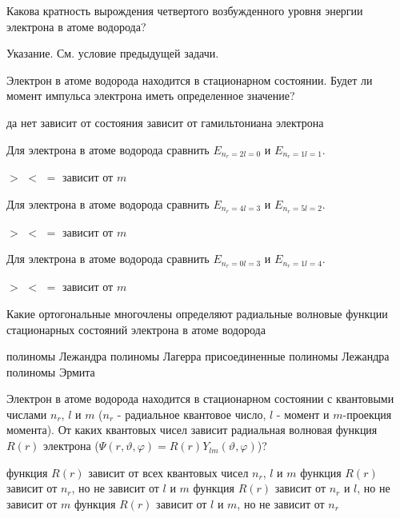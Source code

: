 \documentclass[11pt,a4paper]{exam}
\begin{document}
\begin{questions}
\question Какова кратность вырождения четвертого возбужденного уровня энергии электрона в атоме водорода? 
\begin{choices}
Указание. См. условие предыдущей задачи.
\end{choices}

\question Электрон в атоме водорода находится в стационарном состоянии. Будет ли момент импульса электрона иметь определенное значение?
\begin{choices}
\choice да                
\choice нет
\choice зависит от состояния       
\choice зависит от гамильтониана электрона
\end{choices}

\question Для электрона в атоме водорода сравнить ${E_{{n_r} = 2l = 0}}$ и ${E_{{n_r} = 1l = 1}}$.
\begin{choices}
\choice $ > $       
\choice $ < $       
\choice $ = $    
\choice зависит от $m$
\end{choices}

\question Для электрона в атоме водорода сравнить ${E_{{n_r} = 4l = 3}}$ и ${E_{{n_r} = 5l = 2}}$.
\begin{choices}
\choice $ > $       
\choice $ < $       
\choice $ = $       
\choice зависит от $m$
\end{choices}

\question Для электрона в атоме водорода сравнить ${E_{{n_r} = 0l = 3}}$ и ${E_{{n_r} = 1l = 4}}$.
\begin{choices}
\choice $ > $       
\choice $ < $       
\choice $ = $       
\choice зависит от $m$ 
\end{choices}

\question Какие ортогональные многочлены определяют радиальные волновые функции стационарных состояний электрона в атоме водорода
\begin{choices}
\choice полиномы Лежандра          
\choice полиномы Лагерра
\choice присоединенные полиномы Лежандра       
\choice полиномы Эрмита
\end{choices}

\question Электрон в атоме водорода находится в стационарном состоянии с квантовыми числами ${n_r}$, $l$ и $m$ (${n_r}$ - радиальное квантовое число, $l$ - момент и $m$-проекция момента). От каких квантовых чисел зависит радиальная волновая функция $R(r)$ электрона ($\Psi (r,\vartheta ,\varphi ) = R(r){Y_{lm}}(\vartheta ,\varphi )$)?
\begin{choices}
\choice функция $R(r)$ зависит от всех квантовых чисел ${n_r}$, $l$ и $m$
\choice функция $R(r)$ зависит от ${n_r}$, но не зависит от $l$ и $m$
\choice функция $R(r)$ зависит от ${n_r}$ и $l$, но не зависит от $m$
\choice функция $R(r)$ зависит от $l$ и $m$, но не зависит от ${n_r}$
\end{choices}


\end{questions}
\end{document}
